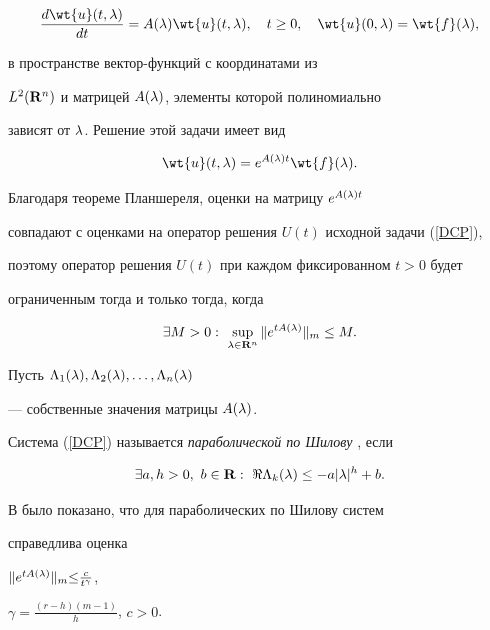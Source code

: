$$




\frac{d\wt{u}(t,\l)}{dt}=A(\l)\wt{u}(t, \l), \quad t\ge 0, 


\quad\wt{u}(0,\l)=\wt{f}(\l),




$$


в пространстве вектор-функций с координатами из


$L^2({\bold R}^n)$ и матрицей $A(\lambda)$, элементы которой полиномиально


зависят от $\lambda$. Решение этой задачи имеет вид


$$


\wt{u}(t,\l)=e^{A(\l)t}\wt{f}(\l).


$$


Благодаря теореме Планшереля, оценки на матрицу $e^{A(\lambda)t}$


совпадают с оценками на оператор решения $U(t)$ исходной задачи (\ref{DCP}),


поэтому оператор решения $U(t)$ при каждом фиксированном $t>0$ будет


ограниченным тогда и только тогда, когда


$$


\exists M>0:\ \sup_{\l\in{\bold R}^n}\|e^{t A(\l)}\|_m\le M.


$$


Пусть $\Lambda_1(\lambda),\Lambda_2(\lambda),\dotsc,\Lambda_n(\lambda)$ 


--- собственные значения матрицы $A(\lambda)$.


Система (\ref{DCP}) называется {\it параболической по Шилову} \cite{K}, если


$$




\exists a, h>0,\  b\in {\bold R}: \ \Re \Lambda_k(\l)\le - a |\l|^h + b.




$$


В \cite{Mel} было показано, что для параболических по Шилову систем


справедлива оценка


$\|e^{t A(\lambda)}\|_m {\le} \frac{c}{t ^\gamma}$,


$\gamma=\frac{(r-h)(m-1)}{h}$, $c>0$.



